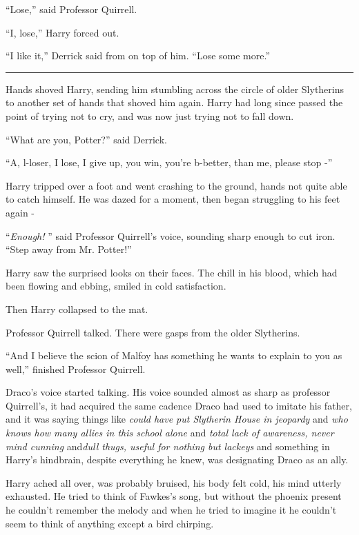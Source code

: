 ``Lose,'' said Professor Quirrell.

``I, lose,'' Harry forced out.

``I like it,'' Derrick said from on top of him. ``Lose some more.''

\begin{center}\rule{3in}{0.4pt}\end{center}

Hands shoved Harry, sending him stumbling across the circle of older
Slytherins to another set of hands that shoved him again. Harry had long
since passed the point of trying not to cry, and was now just trying not
to fall down.

``What are you, Potter?'' said Derrick.

``A, l-loser, I lose, I give up, you win, you're b-better, than me,
please stop -''

Harry tripped over a foot and went crashing to the ground, hands not
quite able to catch himself. He was dazed for a moment, then began
struggling to his feet again -

``\emph{Enough!} '' said Professor Quirrell's voice, sounding sharp enough
to cut iron. ``Step away from Mr. Potter!''

Harry saw the surprised looks on their faces. The chill in his blood,
which had been flowing and ebbing, smiled in cold satisfaction.

Then Harry collapsed to the mat.

Professor Quirrell talked. There were gasps from the older Slytherins.

``And I believe the scion of Malfoy has something he wants to explain to
you as well,'' finished Professor Quirrell.

Draco's voice started talking. His voice sounded almost as sharp as
professor Quirrell's, it had acquired the same cadence Draco had used to
imitate his father, and it was saying things like \emph{could have put
Slytherin House in jeopardy} and \emph{who knows how many allies in this
school alone} and \emph{total lack of awareness, never mind cunning}
and\emph{dull thugs, useful for nothing but lackeys} and something in
Harry's hindbrain, despite everything he knew, was designating Draco as
an ally.

Harry ached all over, was probably bruised, his body felt cold, his mind
utterly exhausted. He tried to think of Fawkes's song, but without the
phoenix present he couldn't remember the melody and when he tried to
imagine it he couldn't seem to think of anything except a bird chirping.

